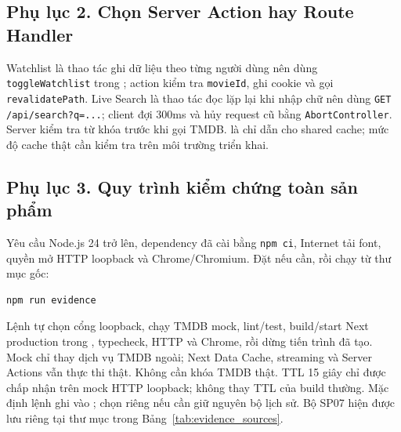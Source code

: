 \documentclass[12pt,a4paper]{extarticle}
\begin{document}
\subsection*{Phụ lục 2. Chọn Server Action hay Route Handler}
Watchlist là thao tác ghi dữ liệu theo từng người dùng nên dùng \texttt{toggleWatchlist} trong ; action kiểm tra \texttt{movieId}, ghi cookie và gọi \texttt{revalidatePath}. Live Search là thao tác đọc lặp lại khi nhập chữ nên dùng \texttt{GET /api/search?q=...}; client đợi 300ms và hủy request cũ bằng \texttt{AbortController}. Server kiểm tra từ khóa trước khi gọi TMDB.  là chỉ dẫn cho shared cache; mức độ cache thật cần kiểm tra trên môi trường triển khai.

\subsection*{Phụ lục 3. Quy trình kiểm chứng toàn sản phẩm}
Yêu cầu Node.js 24 trở lên, dependency đã cài bằng \texttt{npm ci}, Internet tải font, quyền mở HTTP loopback và Chrome/Chromium. Đặt  nếu cần, rồi chạy từ thư mục gốc:
\begin{lstlisting}[language=bash]
npm run evidence
\end{lstlisting}
Lệnh tự chọn cổng loopback, chạy TMDB mock, lint/test, build/start Next production trong , typecheck, HTTP và Chrome, rồi dừng tiến trình đã tạo. Mock chỉ thay dịch vụ TMDB ngoài; Next Data Cache, streaming và Server Actions vẫn thực thi thật. Không cần khóa TMDB thật. TTL 15 giây chỉ được chấp nhận trên mock HTTP loopback; không thay TTL của build thường. Mặc định lệnh ghi vào ; chọn  riêng nếu cần giữ nguyên bộ lịch sử. Bộ SP07 hiện được lưu riêng tại thư mục trong Bảng~\ref{tab:evidence_sources}.
\end{document}
